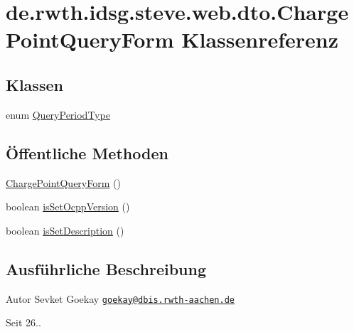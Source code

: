 \hypertarget{classde_1_1rwth_1_1idsg_1_1steve_1_1web_1_1dto_1_1_charge_point_query_form}{\section{de.\-rwth.\-idsg.\-steve.\-web.\-dto.\-Charge\-Point\-Query\-Form Klassenreferenz}
\label{classde_1_1rwth_1_1idsg_1_1steve_1_1web_1_1dto_1_1_charge_point_query_form}
}
\subsection*{Klassen}
\begin{DoxyCompactItemize}
\item 
enum \hyperlink{enumde_1_1rwth_1_1idsg_1_1steve_1_1web_1_1dto_1_1_charge_point_query_form_1_1_query_period_type}{Query\-Period\-Type}
\end{DoxyCompactItemize}
\subsection*{Öffentliche Methoden}
\begin{DoxyCompactItemize}
\item 
\hyperlink{classde_1_1rwth_1_1idsg_1_1steve_1_1web_1_1dto_1_1_charge_point_query_form_a1889afd3020e2eac0f97cc5beb559498}{Charge\-Point\-Query\-Form} ()
\item 
boolean \hyperlink{classde_1_1rwth_1_1idsg_1_1steve_1_1web_1_1dto_1_1_charge_point_query_form_a29a4aeb80a58ddce5e6d326cc43d89ed}{is\-Set\-Ocpp\-Version} ()
\item 
boolean \hyperlink{classde_1_1rwth_1_1idsg_1_1steve_1_1web_1_1dto_1_1_charge_point_query_form_ad5d5507b4b42e4701a1d79a5b16333e5}{is\-Set\-Description} ()
\end{DoxyCompactItemize}


\subsection{Ausführliche Beschreibung}
\begin{DoxyAuthor}{Autor}
Sevket Goekay \href{mailto:goekay@dbis.rwth-aachen.de}{\tt goekay@dbis.\-rwth-\/aachen.\-de} 
\end{DoxyAuthor}
\begin{DoxySince}{Seit}
26.. 
\end{DoxySince}


